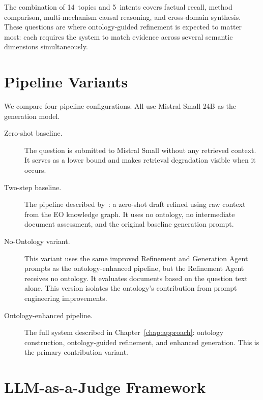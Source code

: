 The combination of 14~topics and 5~intents covers factual recall, method comparison, multi-mechanism causal reasoning, and cross-domain synthesis. These questions are where ontology-guided refinement is expected to matter most: each requires the system to match evidence across several semantic dimensions simultaneously.

\section{Pipeline Variants}
\label{sec:pipeline-variants}

We compare four pipeline configurations. All use Mistral Small 24B as the generation model.

\begin{description}
\item[Zero-shot baseline.] The question is submitted to Mistral Small without any retrieved context. It serves as a lower bound and makes retrieval degradation visible when it occurs.

\item[Two-step baseline.] The pipeline described by~\citet{elbaff2025earthobservationrag}: a zero-shot draft refined using raw context from the EO knowledge graph. It uses no ontology, no intermediate document assessment, and the original baseline generation prompt.

\item[No-Ontology variant.] This variant uses the same improved Refinement and Generation Agent prompts as the ontology-enhanced pipeline, but the Refinement Agent receives no ontology. It evaluates documents based on the question text alone. This version isolates the ontology's contribution from prompt engineering improvements.

\item[Ontology-enhanced pipeline.] The full system described in Chapter~\ref{chap:approach}: ontology construction, ontology-guided refinement, and enhanced generation. This is the primary contribution variant.
\end{description}

\section{LLM-as-a-Judge Framework}
\label{sec:llm-as-judge}

